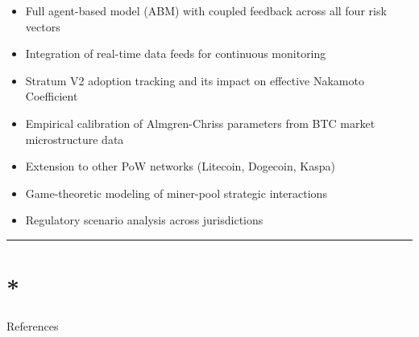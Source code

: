 \documentclass[
  11pt,
]{article}
\providecommand{\tightlist}{%
  \setlength{\itemsep}{0pt}\setlength{\parskip}{0pt}}\usepackage{longtable,booktabs,array}
\let\oldsection\section
\renewcommand{\section}[1]{\FloatBarrier\oldsection{#1}}
\begin{document}
\begin{itemize}
\tightlist
\item
  Full agent-based model (ABM) with coupled feedback across all four
  risk vectors
\item
  Integration of real-time data feeds for continuous monitoring
\item
  Stratum V2 adoption tracking and its impact on effective Nakamoto
  Coefficient
\item
  Empirical calibration of Almgren-Chriss parameters from BTC market
  microstructure data
\item
  Extension to other PoW networks (Litecoin, Dogecoin, Kaspa)
\item
  Game-theoretic modeling of miner-pool strategic interactions
\item
  Regulatory scenario analysis across jurisdictions
\end{itemize}

\begin{center}\rule{0.5\linewidth}{0.5pt}\end{center}

\hypertarget{references}{%
\section*{References}\label{references}}
\end{document}
